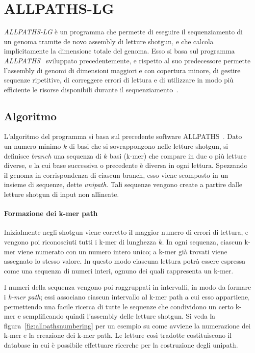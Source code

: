 \documentclass[crop=false, class=book]{standalone}
\begin{document}
	
	
	\section{ALLPATHS-LG}
	\textit{ALLPATHS-LG} è un programma che permette di eseguire il sequenziamento di un genoma tramite de novo assembly di letture shotgun, e che calcola implicitamente la dimensione totale del genoma. Esso si basa sul programma \textit{ALLPATHS}~\cite{butler2008allpaths,maccallum2009allpaths2} sviluppato precedentemente, e rispetto al suo predecessore permette l'assembly di genomi di dimensioni maggiori e con copertura minore, di gestire sequenze ripetitive, di correggere errori di lettura e di utilizzare in modo più efficiente le risorse disponibili durante il sequenziamento~\cite{gnerre2011high}. 
	
	
	\subsection{Algoritmo}
	L'algoritmo del programma si basa sul precedente software ALLPATHS~\cite{butler2008allpaths}. Dato un numero minimo $k$ di basi che si sovrappongono nelle letture shotgun, si definisce \textit{branch} una sequenza di $k$ basi (k-mer) che compare in due o più letture diverse, e la cui base successiva o precedente è diversa in ogni lettura. Spezzando il genoma in corrispondenza di ciascun branch, esso viene scomposto in un insieme di sequenze, dette \textit{unipath}. Tali sequenze vengono create a partire dalle letture shotgun di input non allineate. 
	
	\paragraph{Formazione dei k-mer path}
	Inizialmente negli shotgun viene corretto il maggior numero di errori di lettura, e vengono poi riconosciuti tutti i k-mer di lunghezza $k$. In ogni sequenza, ciascun k-mer viene numerato con un numero intero unico; a k-mer già trovati viene assegnato lo stesso valore. In questo modo ciascuna lettura potrà essere espressa come una sequenza di numeri interi, ognuno dei quali rappresenta un k-mer. 
	
	I numeri della sequenza vengono poi raggruppati in intervalli, in modo da formare i \textit{k-mer path}; essi associano ciascun intervallo al k-mer path a cui esso appartiene, permettendo una facile ricerca di tutte le sequenze che condividono un certo k-mer e semplificando quindi l'assembly delle letture shotgun. Si veda la figura~\vref{fig:allpathsnumbering} per un esempio su come avviene la numerazione dei k-mer e la creazione dei k-mer path.
	Le letture così tradotte costituiscono il database in cui è possibile effettuare ricerche per la costruzione degli unipath.
	
\end{document}
